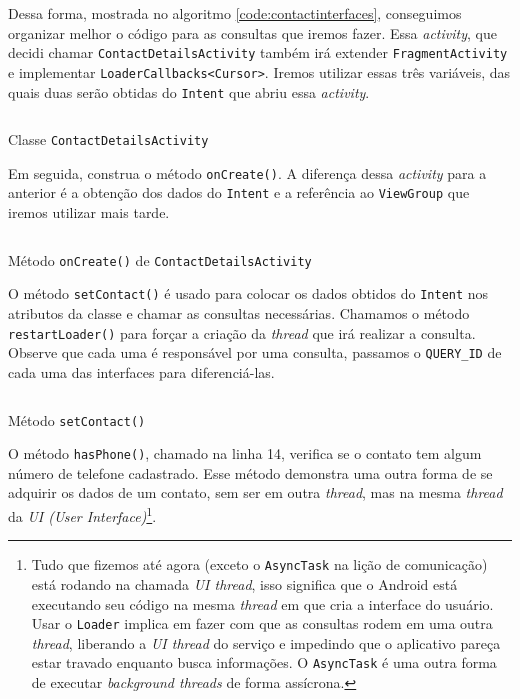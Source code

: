 \documentclass[a4paper,12pt,brazil]{book}
\begin{document}
\begin{singlespace}
	Dessa forma, mostrada no algoritmo \ref{code:contactinterfaces}, conseguimos organizar melhor o código para as consultas que iremos fazer. Essa \emph{activity}, que decidi chamar \texttt{ContactDetailsActivity} também irá extender \texttt{FragmentActivity} e implementar \texttt{LoaderCallbacks<Cursor>}. Iremos utilizar essas três variáveis, das quais duas serão obtidas do \texttt{Intent} que abriu essa \emph{activity}.
	
		\begin{listing}[H]
		\inputminted[linenos=true,fontsize=\small,frame=lines, framesep=2mm, tabsize=2,numbersep=5pt]{java}{src/api/contacts/contactdetails.java}
		\caption{Classe \texttt{ContactDetailsActivity}}
		\label{code:contactdetailsactivity}
		\end{listing} 	


	Em seguida, construa o método \texttt{onCreate()}. A diferença dessa \emph{activity} para a anterior é a obtenção dos dados do \texttt{Intent} e a referência ao \texttt{ViewGroup} que iremos utilizar mais tarde. 

		\begin{listing}[H]
		\inputminted[linenos=true,fontsize=\small,frame=lines, framesep=2mm, tabsize=2,numbersep=5pt]{java}{src/api/contacts/oncreate.java}
		\caption{Método \texttt{onCreate()} de \texttt{ContactDetailsActivity}}
		\label{code:contactdetailsoncreate}
		\end{listing} 	

	O método \texttt{setContact()} é usado para colocar os dados obtidos do \texttt{Intent} nos atributos da classe e chamar as consultas necessárias. Chamamos o método \texttt{restartLoader()} para forçar a criação da \emph{thread} que irá realizar a consulta. Observe que cada uma é responsável por uma consulta, passamos o \texttt{QUERY\_ID} de cada uma das interfaces para diferenciá-las.

		\begin{listing}[H]
		\inputminted[linenos=true,fontsize=\small,frame=lines, framesep=2mm, tabsize=2,numbersep=5pt]{java}{src/api/contacts/setcontact.java}
		\caption{Método \texttt{setContact()}}
		\label{code:contactdetailssetcontact}
		\end{listing} 			
	O método \texttt{hasPhone()}, chamado na linha 14, verifica se o contato tem algum número de telefone cadastrado. Esse método demonstra uma outra forma de se adquirir os dados de um contato, sem ser em outra \emph{thread}, mas na mesma \emph{thread} da \emph{UI (User Interface)}\footnote{Tudo que fizemos até agora (exceto o \texttt{AsyncTask} na lição de comunicação) está rodando na chamada \emph{UI thread}, isso significa que o Android está executando seu código na mesma \emph{thread} em que cria a interface do usuário. Usar o \texttt{Loader} implica em fazer com que as consultas rodem em uma outra \emph{thread}, liberando a \emph{UI thread} do serviço e impedindo que o aplicativo pareça estar travado enquanto busca informações. O \texttt{AsyncTask} é uma outra forma de executar \emph{background threads} de forma assícrona.}. 


\end{singlespace}
\end{document}
